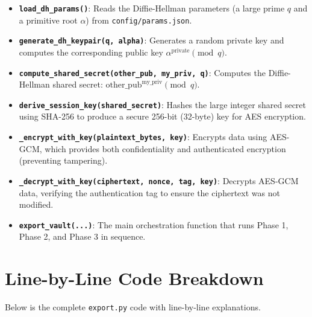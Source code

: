 \documentclass{article}
\begin{document}
\begin{itemize}
    \item \textbf{\texttt{load\_dh\_params()}}: Reads the Diffie-Hellman parameters (a large prime $q$ and a primitive root $\alpha$) from \texttt{config/params.json}.
    \item \textbf{\texttt{generate\_dh\_keypair(q, alpha)}}: Generates a random private key and computes the corresponding public key $\alpha^{\text{private}} \pmod q$.
    \item \textbf{\texttt{compute\_shared\_secret(other\_pub, my\_priv, q)}}: Computes the Diffie-Hellman shared secret: $\text{other\_pub}^{\text{my\_priv}} \pmod q$.
    \item \textbf{\texttt{derive\_session\_key(shared\_secret)}}: Hashes the large integer shared secret using SHA-256 to produce a secure 256-bit (32-byte) key for AES encryption.
    \item \textbf{\texttt{\_encrypt\_with\_key(plaintext\_bytes, key)}}: Encrypts data using AES-GCM, which provides both confidentiality and authenticated encryption (preventing tampering).
    \item \textbf{\texttt{\_decrypt\_with\_key(ciphertext, nonce, tag, key)}}: Decrypts AES-GCM data, verifying the authentication tag to ensure the ciphertext was not modified.
    \item \textbf{\texttt{export\_vault(...)}}: The main orchestration function that runs Phase 1, Phase 2, and Phase 3 in sequence.
\end{itemize}

\section{Line-by-Line Code Breakdown}

Below is the complete \texttt{export.py} code with line-by-line explanations.
\end{document}
